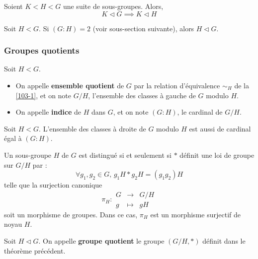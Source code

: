 
  \begin{proposition}
    Soient $K < H < G$ une suite de sous-groupes. Alors,
    \[ K \lhd G \implies K \lhd H \]
  \end{proposition}


  \begin{proposition}
    Soit $H < G$. Si $(G:H) = 2$ (voir sous-section suivante), alors $H \lhd G$.
  \end{proposition}

  \subsubsection{Groupes quotients}

  \begin{definition}
    Soit $H < G$.
    \begin{itemize}
      \item On appelle \textbf{ensemble quotient} de $G$ par la relation d'équivalence $\sim_H$ de la \cref{103-1}, et on note $G/H$, l'ensemble des classes à gauche de $G$ modulo $H$.
      \item On appelle \textbf{indice} de $H$ dans $G$, et on note $(G:H)$, le cardinal de $G/H$.
    \end{itemize}
  \end{definition}

  \begin{proposition}
    Soit $H < G$. L'ensemble des classes à droite de $G$ modulo $H$ est aussi de cardinal égal à $(G:H)$.
  \end{proposition}


  \begin{theorem}
    Un sous-groupe $H$ de $G$ est distingué si et seulement si $*$ définit une loi de groupe sur $G/H$ par :
    \[ \forall g_1, g_2 \in G, \, g_1 H * g_2 H = (g_1 g_2) H \]
    telle que la surjection canonique
    \[
      \pi_H :
      \begin{array}{ccc}
        G &\rightarrow& G/H \\
        g &\mapsto& gH
      \end{array}
    \]
    soit un morphisme de groupes. Dans ce cas, $\pi_H$ est un morphisme surjectif de noyau $H$.
  \end{theorem}

  \begin{definition}
    Soit $H \lhd G$. On appelle \textbf{groupe quotient} le groupe $(G/H, *)$ définit dans le théorème précédent.
  \end{definition}

